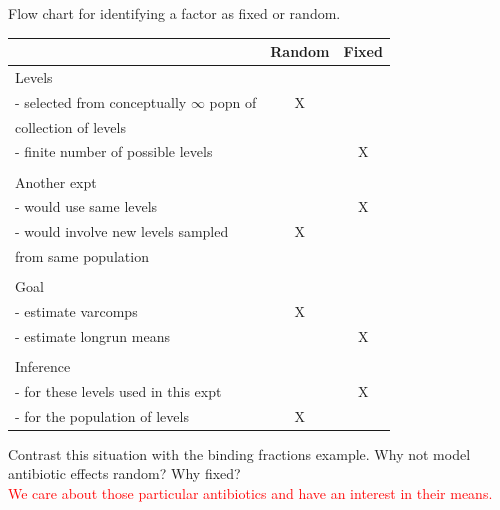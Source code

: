 \begin{center}
Flow chart for identifying a factor as fixed or random.\\
\begin{tabular}{l| c c}
& Random & Fixed \\ \hline
Levels \\
- selected from conceptually $\infty$ popn of & X & \\
collection of levels & & \\
- finite number of possible  levels & & X \\
\\ \hline
Another expt & & \\
- would use same levels & & X \\
- would involve new levels sampled & X & \\
from same population \\
\\ \hline
Goal  & & \\
- estimate varcomps & X & \\
- estimate longrun means & & X\\
\\ \hline
Inference & & \\
- for these levels  used in this expt & & X\\
- for the population of levels & X & \\
\end{tabular}
\end{center}
Contrast this situation with the binding fractions example.  Why not model antibiotic effects random?  Why fixed?%
\\
\textcolor{red}{We care about those particular antibiotics and have an interest in their means.}
\newpage

